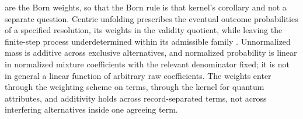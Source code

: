 are the Born weights, so that the Born rule is that kernel's corollary and not a separate question. Centric unfolding prescribes the eventual outcome probabilities of a specified resolution, its weights in the validity quotient, while leaving the finite-step process underdetermined within its admissible family \cite{Aethus}. Unnormalized mass is additive across exclusive alternatives, and normalized probability is linear in normalized mixture coefficients with the relevant denominator fixed; it is not in general a linear function of arbitrary raw coefficients. The weights enter through the weighting scheme on terms, through the kernel for quantum attributes, and additivity holds across record-separated terms, not across interfering alternatives inside one agreeing term.
